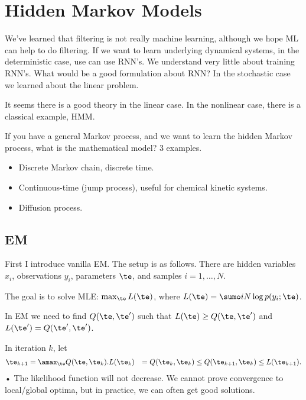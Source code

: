\section{Hidden Markov Models}

We've learned that filtering is not really machine learning, although we hope ML can help to do filtering. If we want to learn underlying dynamical systems, in the deterministic case, use can use RNN's. We understand very little about training RNN's. What would be a good formulation about RNN? In the stochastic case we learned about the linear problem. 

It seems there is a good theory in the linear case. In the nonlinear case, there is a classical example, HMM.

If you have a general Markov process, and we want to learn the hidden Markov process, what is the mathematical model? 3 examples.
\begin{itemize}
\item
 Discrete Markov chain, discrete time. 
 \item
 Continuous-time (jump process), useful for chemical kinetic systems.
 \item
Diffusion process.
\end{itemize}
\subsection{EM}
First I introduce vanilla EM. The setup is as follows. There are hidden variables $x_i$, observations $y_i$, parameters $\te$, and samples $i=1,\ldots, N$. 

The goal is to solve MLE: $\max_\te L(\te)$, where $L(\te) = \sumo iN \log p(y_i; \te)$. 

In EM we need to find $Q(\te, \te')$ such that $L(\te) \ge Q(\te, \te')$ and $L(\te') = Q(\te',\te')$. %

In iteration $k$, let
\begin{align}
\te_{k+1}&=\amax_\te Q(\te, \te_k).
L(\te_k) &=Q(\te_k,\te_k) \le Q(\te_{k+1},\te_k)\le L(\te_{k+1}).
\end{align}•
The likelihood function will not decrease. We cannot prove convergence to local/global optima, but in practice, we can often get good solutions.

